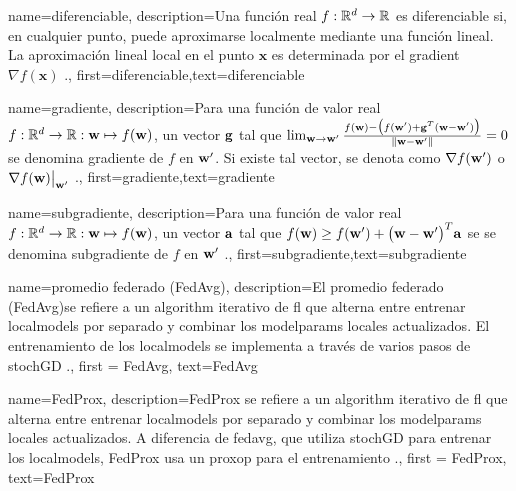 {name={diferenciable},
	description={Una función real $f: \mathbb{R}^{d} \rightarrow \mathbb{R}$ 
		es diferenciable si, en cualquier punto, puede aproximarse localmente mediante una función lineal.
		La aproximación lineal local en el punto $\mathbf{x}$ es determinada por el 
		\gls{gradient} $\nabla f ( \mathbf{x})$ \cite{RudinBookPrinciplesMatheAnalysis}.},
	first={diferenciable},text={diferenciable} 
}

{name={gradiente},
	description={Para una función de valor real $f: \mathbb{R}^{d} \rightarrow \mathbb{R}: {\bf w} \mapsto f({\bf w})$, 
	un vector ${\bf g}$ tal que $\lim_{{\bf w} \rightarrow {\bf w}'} \frac{f({\bf w}) - \big(f({\bf w}')+ {\bf g}^{T} ({\bf w}- {\bf w}') \big) }{\| {\bf w}-{\bf w}'\|}=0$ 
	se denomina gradiente de $f$ en ${\bf w}'$. Si existe tal vector, se denota como
	$\nabla f({\bf w}')$ o $\nabla f({\bf w})\big|_{{\bf w}'}$ \cite{RudinBookPrinciplesMatheAnalysis}.},
	first={gradiente},text={gradiente} 
}

{name={subgradiente},
description={Para una función de valor real $f: \mathbb{R}^{d} \rightarrow \mathbb{R}: {\bf w} \mapsto f({\bf w})$, 
		un vector ${\bf a}$ tal que $f({\bf w}) \geq  f({\bf w}') +\big({\bf w}-{\bf w}' \big)^{T} {\bf a}$ se 
		se denomina subgradiente de $f$ en ${\bf w}'$ \cite{BertCvxAnalOpt,BertsekasNonLinProgr}.},
	first={subgradiente},text={subgradiente} 
}

{name={promedio federado (FedAvg)},
	description={El promedio federado (FedAvg)se refiere a un \gls{algorithm} iterativo de \gls{fl} que alterna entre entrenar \gls{localmodel}s por separado y combinar los \gls{modelparams} locales actualizados.
		El entrenamiento de los \gls{localmodel}s se implementa a través de varios pasos de \gls{stochGD} \cite{pmlr-v54-mcmahan17a}.}, 
		first = {FedAvg}, text={FedAvg} 
}

{name={FedProx},
	description={FedProx  se refiere a un \gls{algorithm} iterativo de \gls{fl} que alterna entre entrenar \gls{localmodel}s por separado y combinar los \gls{modelparams} locales actualizados. 
		A diferencia de \gls{fedavg}, que utiliza \gls{stochGD} para entrenar los \gls{localmodel}s, FedProx usa un \gls{proxop}  para el entrenamiento \cite{FedProx2020}.}, 
	first = {FedProx}, text={FedProx} 
}


